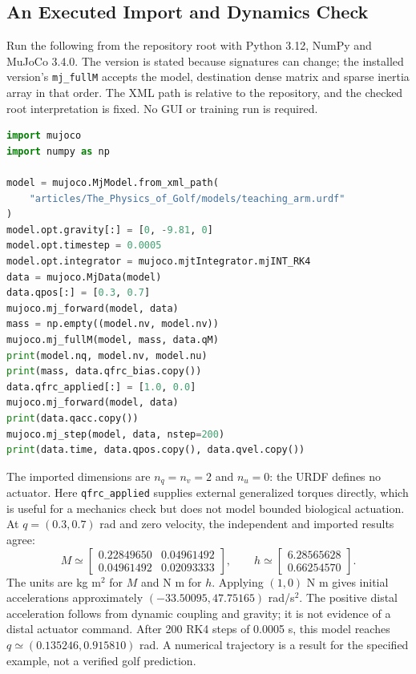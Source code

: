 \subsection{An Executed Import and Dynamics Check}
\label{ex:auto_dynamics}

Run the following from the repository root with Python 3.12, NumPy and MuJoCo 3.4.0. The version is stated because signatures can change; the installed version's \texttt{mj\_fullM} accepts the model, destination dense matrix and sparse inertia array in that order. The XML path is relative to the repository, and the checked root interpretation is fixed. No GUI or training run is required.

\begin{lstlisting}[language=Python,columns=fullflexible,breakatwhitespace=true]
import mujoco
import numpy as np

model = mujoco.MjModel.from_xml_path(
    "articles/The_Physics_of_Golf/models/teaching_arm.urdf"
)
model.opt.gravity[:] = [0, -9.81, 0]
model.opt.timestep = 0.0005
model.opt.integrator = mujoco.mjtIntegrator.mjINT_RK4
data = mujoco.MjData(model)
data.qpos[:] = [0.3, 0.7]
mujoco.mj_forward(model, data)
mass = np.empty((model.nv, model.nv))
mujoco.mj_fullM(model, mass, data.qM)
print(model.nq, model.nv, model.nu)
print(mass, data.qfrc_bias.copy())
data.qfrc_applied[:] = [1.0, 0.0]
mujoco.mj_forward(model, data)
print(data.qacc.copy())
mujoco.mj_step(model, data, nstep=200)
print(data.time, data.qpos.copy(), data.qvel.copy())
\end{lstlisting}

The imported dimensions are $n_q=n_v=2$ and $n_u=0$: the URDF defines no actuator. Here \texttt{qfrc\_applied} supplies external generalized torques directly, which is useful for a mechanics check but does not model bounded biological actuation. At $q=(0.3,0.7)$ rad and zero velocity, the independent and imported results agree:
\begin{equation}
M\simeq\begin{bmatrix}0.22849650&0.04961492\\0.04961492&0.02093333\end{bmatrix},\qquad
h\simeq\begin{bmatrix}6.28565628\\0.66254570\end{bmatrix}.
\end{equation}
The units are kg m$^2$ for $M$ and N m for $h$. Applying $(1,0)$ N m gives initial accelerations approximately $(-33.50095,47.75165)$ rad/s$^2$. The positive distal acceleration follows from dynamic coupling and gravity; it is not evidence of a distal actuator command. After 200 RK4 steps of 0.0005 s, this model reaches $q\simeq(0.135246,0.915810)$ rad. A numerical trajectory is a result for the specified example, not a verified golf prediction.

